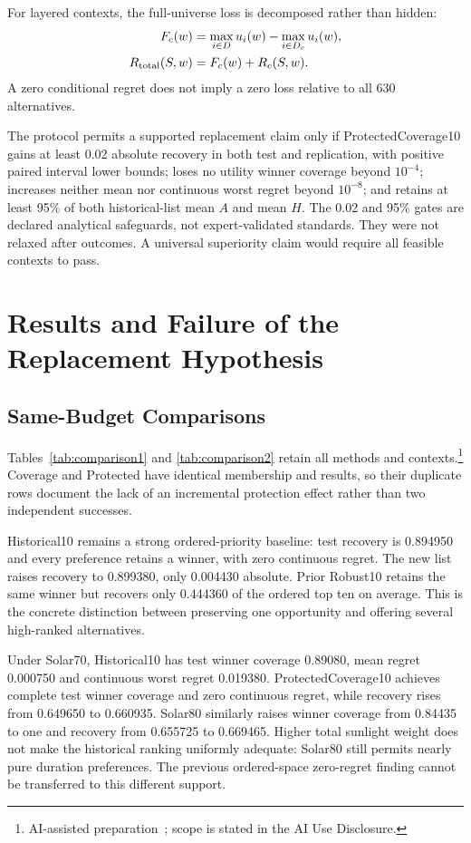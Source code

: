 \documentclass{llncs}
\newcommand{\aidraft}{\footnote{AI-assisted preparation~\cite{openai2026}; scope is stated in the AI Use Disclosure.}}
\begin{document}
For layered contexts, the full-universe loss is decomposed rather than hidden:
\begin{align}
 F_c(w)&=\max_{i\in D}u_i(w)-\max_{i\in D_c}u_i(w),\\
 R_{\rm total}(S,w)&=F_c(w)+R_c(S,w).
\end{align}
A zero conditional regret does not imply a zero loss relative to all 630 alternatives.

The protocol permits a supported replacement claim only if ProtectedCoverage10 gains at least 0.02 absolute recovery in both test and replication, with positive paired interval lower bounds; loses no utility winner coverage beyond $10^{-4}$; increases neither mean nor continuous worst regret beyond $10^{-8}$; and retains at least 95\% of both historical-list mean $A$ and mean $H$. The 0.02 and 95\% gates are declared analytical safeguards, not expert-validated standards. They were not relaxed after outcomes. A universal superiority claim would require all feasible contexts to pass.

\section{Results and Failure of the Replacement Hypothesis}
\subsection{Same-Budget Comparisons}
Tables~\ref{tab:comparison1} and \ref{tab:comparison2} retain all methods and contexts.\aidraft{} Coverage and Protected have identical membership and results, so their duplicate rows document the lack of an incremental protection effect rather than two independent successes.



Historical10 remains a strong ordered-priority baseline: test recovery is 0.894950 and every preference retains a winner, with zero continuous regret. The new list raises recovery to 0.899380, only 0.004430 absolute. Prior Robust10 retains the same winner but recovers only 0.444360 of the ordered top ten on average. This is the concrete distinction between preserving one opportunity and offering several high-ranked alternatives.

Under Solar70, Historical10 has test winner coverage 0.89080, mean regret 0.000750 and continuous worst regret 0.019380. ProtectedCoverage10 achieves complete test winner coverage and zero continuous regret, while recovery rises from 0.649650 to 0.660935. Solar80 similarly raises winner coverage from 0.84435 to one and recovery from 0.655725 to 0.669465. Higher total sunlight weight does not make the historical ranking uniformly adequate: Solar80 still permits nearly pure duration preferences. The previous ordered-space zero-regret finding cannot be transferred to this different support.
\end{document}
